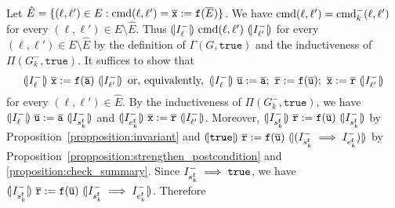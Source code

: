 Let $\hat{E} = \{ (\ell, \ell') \in E : \textmd{cmd} (\ell, \ell') =
\overline{\mathtt{x}} := \mathtt{f} (\overline{E}) \}$. We have
$\textmd{cmd} (\ell, \ell') = \textmd{cmd}^-_k (\ell, \ell')$ for every
$(\ell, \ell') \in E \setminus \hat{E}$. Thus $(\!| {I^-_{\ell}} |\!)\
\textmd{cmd} (\ell, \ell')\ (\!| {I^-_{\ell'}} |\!)$ for every $(\ell,
\ell') \in E \setminus \hat{E}$ by the definition of $\Gamma (G,
\mathtt{true})$ and the inductiveness of $\Pi (G^-_k,
\mathtt{true})$. It suffices to show that
\begin{equation*}
  \assert{I^-_{\ell}}\
  \overline{\mathtt{x}} := \mathtt{f} (\overline{\mathtt{a}})
  \ \assert{I^-_{\ell'}}
  \hspace{0.5em}
  \textmd{or, equivalently,}
  \hspace{0.5em}
  \assert{I^-_{\ell}}\ 
  \overline{\mathtt{u}} := \overline{\mathtt{a}};\ 
  \mathtt{\overline{r}} := \mathtt{f} (\overline{\mathtt{u}});\ 
  \overline{\mathtt{x}} := \mathtt{\overline{r}}
  \ \assert{I^-_{\ell'}}
\end{equation*}
for every $(\ell, \ell') \in \hat{E}$. 
By the inductiveness of $\Pi (G^-_k, \mathtt{true})$, we have
$\assert{I^-_{\ell}}\ \overline{\mathtt{u}} := \overline{\mathtt{a}}\
\assert{I^-_{s_k^\fun{f}}}$ and
$(\!| {I^-_{e_k^{\mathtt{{f}}}}} |\!)\ \overline{\mathtt{x}} :=
\mathtt{\overline{r}}\ (\!| {I^-_{\ell'}} |\!)$. 
Moreover,
$(\!| {I^-_{s_k^\mathtt{f}}} |\!)\
\mathtt{\overline{r}} := \mathtt{f}
(\overline{\mathtt{u}})\ (\!| {I^-_{s_k^{\mathtt{{f}}}}} |\!)$ 
by Proposition~\ref{propposition:invariant}
and
$(\!| {\mathtt{true}} |\!)\ \mathtt{\overline{r}} := \mathtt{f}
(\overline{\mathtt{u}})\ (\!| {(I^-_{s_k^{\mathtt{{f}}}} \implies
  I^-_{e_k^{\mathtt{{f}}}})} |\!)$ by Proposition~\ref{propposition:strengthen_postcondition} and \ref{proposition:check_summary}.
Since $I^-_{s_k^{\mathtt{{f}}}} \implies \mathtt{true}$, we have
$(\!| {I^-_{s_k^{\mathtt{{f}}}}} |\!)\
\mathtt{\overline{r}} := \mathtt{f}
(\overline{\mathtt{u}})\  (\!| {I^-_{s_k^{\mathtt{{f}}}}
  \implies I^-_{e_k^{\mathtt{{f}}}}} |\!)$. Therefore
\begin{prooftree}



\end{prooftree}